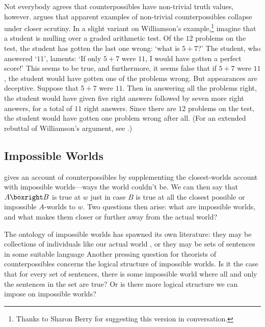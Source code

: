 Not everybody agrees that counterpossibles have non-trivial truth values, however.  \citet[172]{williamson-philofphil} argues that apparent examples of non-trivial counterpossibles collapse under closer scrutiny.  In a slight variant on Williamson's example,\footnote{Thanks to Sharon Berry for suggesting this version in conversation.} imagine that a student is mulling over a graded arithmetic test.  Of the $12$ problems on the test, the student has gotten the last one wrong: `what is $5+7$?'  The student, who answered `$11$', laments: `If only $5+7$ were $11$, I would have gotten a perfect score!'  This seems to be true, and furthermore, it seems false that if $5+7$ were $11$, the student would have gotten one of the problems wrong.  But appearances are deceptive.  Suppose that $5+7$ were $11$.  Then in answering all the problems right, the student would have given five right answers followed by seven more right answers, for a total of $11$ right answers.  Since there are $12$ problems on the test, the student would have gotten one problem wrong after all.  (For an extended rebuttal of Williamson's argument, see \citealp{SalernoForthcoming-SALWOC}.)


\subsection{Impossible Worlds}

\citet{Nolan1997-DANIWA} gives an account of counterpossibles by supplementing the closest-worlds account with impossible worlds---ways the world couldn't be. We can then say that $A \boxright B$ is true at $w$ just in case $B$ is true at all the closest possible or impossible $A$-worlds to $w$.  Two questions then arise: what are impossible worlds, and what makes them closer or further away from the actual world?

The ontology of impossible worlds has spawned its own literature: they may be collections of individuals like our actual world \citep{Yagisawa2010-YAGWAI}, or they may be sets of sentences in some suitable language \citetext{\citealp{Hintikka1975-HINIPW, melia:reducing, sider:pluriverse}; see \citealp{Berto2013-BERIW}, for a general overview and discussion.}  Another pressing question for theorists of counterpossibles concerns the logical structure of impossible worlds.  Is it the case that for every set of sentences, there is some impossible world where all and only the sentences in the set are true?  Or is there more logical structure we can impose on impossible worlds?

